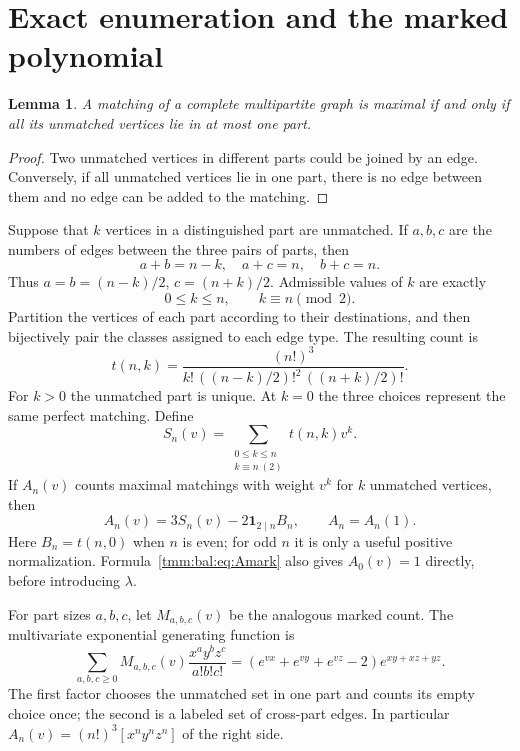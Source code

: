 \documentclass[11pt,letterpaper]{article}
\newtheorem{lemma}[theorem]{Lemma}
\theoremstyle{remark}\newtheorem{remark}[theorem]{Remark}
\newcommand{\one}{\mathbf 1}\newcommand{\TV}{d_{\mathrm{TV}}}
\begin{document}
\section{Exact enumeration and the marked polynomial}\label{tmm:bal:sec:exact}
\begin{lemma}\label{tmm:bal:lem:maximal}
A matching of a complete multipartite graph is maximal if and only if all its unmatched vertices lie in at most one part.
\end{lemma}
\begin{proof}
Two unmatched vertices in different parts could be joined by an edge. Conversely, if all unmatched vertices lie in one part, there is no edge between them and no edge can be added to the matching.
\end{proof}

Suppose that $k$ vertices in a distinguished part are unmatched. If $a,b,c$ are the numbers of edges between the three pairs of parts, then
\[
 a+b=n-k,\quad a+c=n,\quad b+c=n.
\]
Thus $a=b=(n-k)/2$, $c=(n+k)/2$. Admissible values of $k$ are exactly
\[
 0\le k\le n,\qquad k\equiv n\pmod2.
\]
Partition the vertices of each part according to their destinations, and then bijectively pair the classes assigned to each edge type. The resulting count is
\begin{equation}\label{tmm:bal:eq:t}
 t(n,k)=\frac{(n!)^3}{k!\,((n-k)/2)!^2\,((n+k)/2)!}.
\end{equation}
For $k>0$ the unmatched part is unique. At $k=0$ the three choices represent the same perfect matching. Define
\begin{equation}\label{tmm:bal:eq:S}
 S_n(v)=\sum_{\substack{0\le k\le n\\k\equiv n\ (2)}}t(n,k)v^k.
\end{equation}
If $A_n(v)$ counts maximal matchings with weight $v^k$ for $k$ unmatched vertices, then
\begin{equation}\label{tmm:bal:eq:Amark}
 A_n(v)=3S_n(v)-2\one_{2\mid n}B_n,\qquad A_n=A_n(1).
\end{equation}
Here $B_n=t(n,0)$ when $n$ is even; for odd $n$ it is only a useful positive normalization. Formula~\eqref{tmm:bal:eq:Amark} also gives $A_0(v)=1$ directly, before introducing $\lambda$.

For part sizes $a,b,c$, let $M_{a,b,c}(v)$ be the analogous marked count. The multivariate exponential generating function is
\begin{equation}\label{tmm:bal:eq:egf}
 \sum_{a,b,c\ge0}M_{a,b,c}(v)\frac{x^ay^bz^c}{a!b!c!}
  =(e^{vx}+e^{vy}+e^{vz}-2)e^{xy+xz+yz}.
\end{equation}
The first factor chooses the unmatched set in one part and counts its empty choice once; the second is a labeled set of cross-part edges. In particular $A_n(v)=(n!)^3[x^ny^nz^n]$ of the right side.
\end{document}
